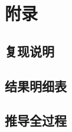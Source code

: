 \appendix
\section{附录}
\label{sec:appendix}

\subsection{复现说明}

\subsection{结果明细表}

\subsection{推导全过程}



